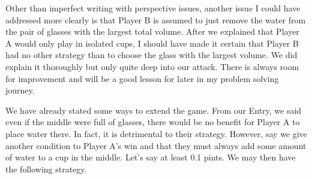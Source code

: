 \documentclass[11pt]{article}
\newcommand{\keywordfont}{\textsc}
\newcommand{\keyword}[1]{%
  \marginpar{\raggedright\small\keywordfont{#1}}}
\begin{document}
Other than imperfect\keyword{Reflect} writing with perspective issues, another issue I could have addressed more clearly is that Player B is assumed to just remove the water from the pair of glasses with the largest total volume. After we explained that Player A would only play in isolated cups, I should have made it certain that Player B had no other strategy than to choose the glass with the largest volume. We did explain it thoroughly but only quite deep into our attack. There is always room for improvement and will be a good lesson for later in my problem solving journey.

We have already stated some ways to \keyword{Extend} extend the game. From our Entry, we said even if the middle were full of glasses, there would be no benefit for Player A to place water there. In fact, it is detrimental to their strategy. However, say we give another condition to Player A's win and that they must always add some amount of water to a cup in the middle. Let's say at least 0.1 pints. We may then have the following strategy.
\end{document}
